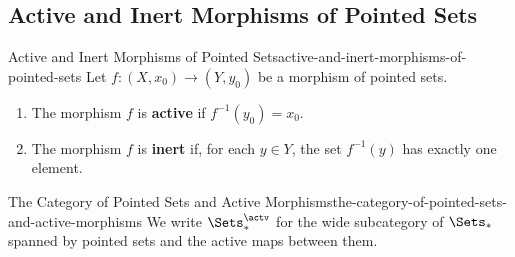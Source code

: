 \subsection{Active and Inert Morphisms of Pointed Sets}\label{subsection-active-and-inert-morphisms-of-pointed-sets}
\begin{definition}{Active and Inert Morphisms of Pointed Sets}{active-and-inert-morphisms-of-pointed-sets}%
    Let $f\colon(X,x_{0})\to(Y,y_{0})$ be a morphism of pointed sets.
    \begin{enumerate}
        \item\label{active-and-inert-morphisms-of-pointed-sets-active-morphisms-of-pointed-sets}The morphism $f$ is \textbf{active} if $f^{-1}(y_{0})=x_{0}$.
        \item\label{active-and-inert-morphisms-of-pointed-sets-inert-morphisms-of-pointed-sets}The morphism $f$ is \textbf{inert} if, for each $y\in Y$, the set $f^{-1}(y)$ has exactly one element.
    \end{enumerate}
\end{definition}
\begin{notation}{The Category of Pointed Sets and Active Morphisms}{the-category-of-pointed-sets-and-active-morphisms}%
    We write $\Sets^{\actv}_{*}$ for the wide subcategory of $\Sets_{*}$ spanned by pointed sets and the active maps between them.
\end{notation}
